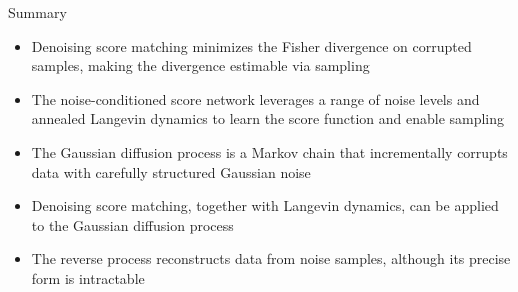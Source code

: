 \documentclass{beamer}
\begin{document}
\begin{frame}{Summary}
	\begin{itemize}
		\item Denoising score matching minimizes the Fisher divergence on corrupted samples, making the divergence estimable via sampling
		\vfill 
		\item The noise-conditioned score network leverages a range of noise levels and annealed Langevin dynamics to learn the score function and enable sampling	
		\vfill
		\item The Gaussian diffusion process is a Markov chain that incrementally corrupts data with carefully structured Gaussian noise
		\vfill
		\item Denoising score matching, together with Langevin dynamics, can be applied to the Gaussian diffusion process
		\vfill
		\item The reverse process reconstructs data from noise samples, although its precise form is intractable
	\end{itemize}
\end{frame}
\end{document}
